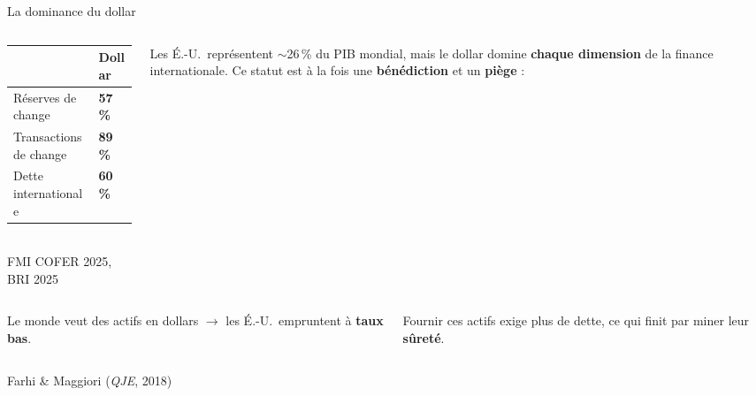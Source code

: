\documentclass[aspectratio=169]{beamer}
\begin{document}
\begin{frame}[t]{La dominance du dollar}
   \small
   \vspace{0.1cm}
   \begin{columns}[T]
      \begin{column}{0.52\textwidth}
         \renewcommand{\arraystretch}{1.4}
         \begin{tabularx}{\textwidth}{>{\small}X >{\small\centering\arraybackslash}p{1.5cm}}
            \toprule
            & \textbf{Dollar} \\
            \midrule
            Réserves de change & \textbf{57\,\%} \\
            Transactions de change & \textbf{89\,\%} \\
            Dette internationale & \textbf{60\,\%} \\
            \bottomrule
         \end{tabularx}
         \\
         \vspace{0.2cm}
         {\scriptsize\textcolor{HECgray}{FMI COFER 2025, BRI 2025}}
      \end{column}
      \begin{column}{0.42\textwidth}
         \vspace{0.3cm}
         Les É.-U.\ représentent $\sim$26\,\% du PIB mondial, mais le dollar domine \textbf{chaque dimension} de la finance internationale. Ce statut est à la fois une \textbf{bénédiction} et un \textbf{piège} :
      \end{column}
   \end{columns}
   \vspace{0.25cm}
   \begin{columns}[T]
      \begin{column}{0.47\textwidth}
         \begin{defbox}
            \scriptsize
            Le monde veut des actifs en dollars $\to$ les É.-U.\ empruntent à \textbf{taux bas}.
         \end{defbox}
      \end{column}
      \begin{column}{0.47\textwidth}
         \begin{warning}
            \scriptsize
            Fournir ces actifs exige plus de dette, ce qui finit par miner leur \textbf{sûreté}.
         \end{warning}
      \end{column}
   \end{columns}
   \mbox{}\hfill{\scriptsize\textcolor{HECgray}{Farhi \& Maggiori (\textit{QJE}, 2018)}}
\end{frame}
\end{document}
